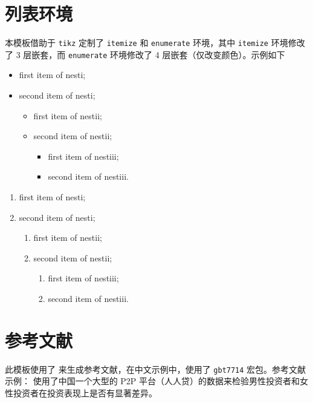 \documentclass[cn,11pt]{elegantbook}
\begin{document}
\section{列表环境}
本模板借助于 \lstinline{tikz} 定制了 \lstinline{itemize} 和 \lstinline{enumerate} 环境，其中 \lstinline{itemize} 环境修改了 3 层嵌套，而 \lstinline{enumerate} 环境修改了 4 层嵌套（仅改变颜色）。示例如下\\[2ex]
\begin{minipage}[b]{0.49\textwidth}
\begin{itemize}
   \item first item of nesti;
   \item second item of nesti;
   \begin{itemize}
      \item first item of nestii;
      \item second item of nestii;
      \begin{itemize}
         \item first item of nestiii;
         \item second item of nestiii.
      \end{itemize}   
   \end{itemize}
\end{itemize}
\end{minipage}
\begin{minipage}[b]{0.49\textwidth}
\begin{enumerate}
   \item first item of nesti;
   \item second item of nesti;
   \begin{enumerate}
      \item first item of nestii;
      \item second item of nestii;
      \begin{enumerate}
         \item first item of nestiii;
         \item second item of nestiii.
      \end{enumerate}   
   \end{enumerate}
\end{enumerate}
\end{minipage}

\section{参考文献}

此模板使用了  来生成参考文献，在中文示例中，使用了 \lstinline{gbt7714} 宏包。参考文献示例：\cite{en1,en2,en3} 使用了中国一个大型的 P2P 平台（人人贷）的数据来检验男性投资者和女性投资者在投资表现上是否有显著差异。
\end{document}
